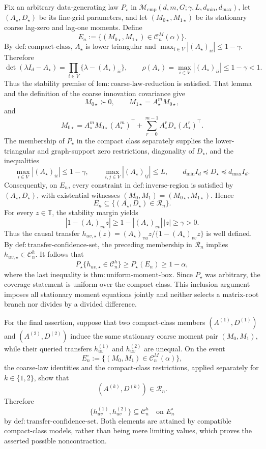Fix an arbitrary data-generating law \(P_\star\) in
\(\mathcal M_{\mathrm{cmp}}(d,m,G;\gamma,L,d_{\min},d_{\max})\), let
\((A_\star,D_\star)\) be its fine-grid parameters, and let
\((M_{0\star},M_{1\star})\) be its stationary coarse lag-zero and lag-one
moments.  Define
\[
 E_n:=\{(M_{0\star},M_{1\star})\in\mathcal C_n^M(\alpha)\}.
\]
By \(\mathrm{def{:}compact\mbox{-}class}\), \(A_\star\) is lower
triangular and
\(\max_{i\in V}|(A_\star)_{ii}|\leq 1-\gamma\).  Therefore
\[
 \det(\lambda I_d-A_\star)
 =\prod_{i\in V}\{\lambda-(A_\star)_{ii}\},
 \qquad
 \rho(A_\star)=\max_{i\in V}|(A_\star)_{ii}|
 \leq 1-\gamma<1.
\]
Thus the stability premise of
\(\mathrm{lem{:}coarse\mbox{-}law\mbox{-}reduction}\) is satisfied.
That lemma and the definition of the coarse innovation covariance give
\[
 M_{0\star}\succ0,
 \qquad
 M_{1\star}=A_\star^mM_{0\star},
\]
and
\[
 M_{0\star}
 =A_\star^mM_{0\star}(A_\star^m)^\top
  +\sum_{r=0}^{m-1}A_\star^rD_\star(A_\star^r)^\top.
\]
The membership of \(P_\star\) in the compact class separately supplies
the lower-triangular and graph-support zero restrictions, diagonality of
\(D_\star\), and the inequalities
\[
 \max_{i\in V}|(A_\star)_{ii}|\leq1-\gamma,
 \qquad
 \max_{i,j\in V}|(A_\star)_{ij}|\leq L,
 \qquad
 d_{\min}I_d\preceq D_\star\preceq d_{\max}I_d.
\]
Consequently, on \(E_n\), every constraint in
\(\mathrm{def{:}inverse\mbox{-}region}\) is satisfied by
\((A_\star,D_\star)\), with existential witnesses
\((M_0,M_1)=(M_{0\star},M_{1\star})\).  Hence
\[
 E_n\subseteq\{(A_\star,D_\star)\in\mathcal R_n\}.
\]
For every \(z\in\mathbb T\), the stability margin yields
\[
 |1-(A_\star)_{vv}z|
 \geq 1-|(A_\star)_{vv}|\,|z|
 \geq\gamma>0.
\]
Thus the causal transfer
\(h_{uv,\star}(z)=(A_\star)_{vu}z/
\{1-(A_\star)_{vv}z\}\) is well defined.  By
\(\mathrm{def{:}transfer\mbox{-}confidence\mbox{-}set}\), the preceding
membership in \(\mathcal R_n\) implies
\(h_{uv,\star}\in\mathcal C_n^h\).  It follows that
\[
 P_\star\{h_{uv,\star}\in\mathcal C_n^h\}
 \geq P_\star(E_n)
 \geq1-\alpha,
\]
where the last inequality is
\(\mathrm{thm{:}uniform\mbox{-}moment\mbox{-}box}\).  Since
\(P_\star\) was arbitrary, the coverage statement is uniform over the
compact class.  This inclusion argument imposes all stationary moment
equations jointly and neither selects a matrix-root branch nor divides by a
divided difference.

For the final assertion, suppose that two compact-class members
\((A^{(1)},D^{(1)})\) and \((A^{(2)},D^{(2)})\) induce the same stationary
coarse moment pair \((M_0,M_1)\), while their queried transfers
\(h_{uv}^{(1)}\) and \(h_{uv}^{(2)}\) are unequal.  On the event
\[
 E_n^\circ:=\{(M_0,M_1)\in\mathcal C_n^M(\alpha)\},
\]
the coarse-law identities and the compact-class restrictions, applied
separately for \(k\in\{1,2\}\), show that
\[
 (A^{(k)},D^{(k)})\in\mathcal R_n.
\]
Therefore
\[
 \{h_{uv}^{(1)},h_{uv}^{(2)}\}\subseteq\mathcal C_n^h
 \quad\text{on }E_n^\circ
\]
by \(\mathrm{def{:}transfer\mbox{-}confidence\mbox{-}set}\).  Both
elements are attained by compatible compact-class models, rather than being
mere limiting values, which proves the asserted possible noncontraction.

